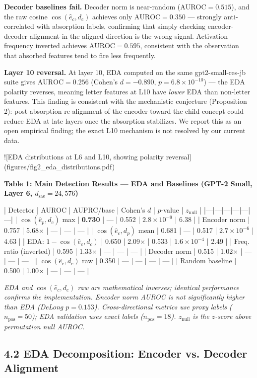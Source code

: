 \documentclass{article}
\begin{document}
\textbf{Decoder baselines fail.} Decoder norm is near-random ($\text{AUROC} = 0.515$), and
the raw cosine $\cos(\hat{e}_c, d_c)$ achieves only $\text{AUROC} = 0.350$ — strongly
anti-correlated with absorption labels, confirming that simply checking encoder-decoder
alignment in the aligned direction is the wrong signal.
Activation frequency inverted achieves $\text{AUROC} = 0.595$, consistent with the
observation that absorbed features tend to fire less frequently.

\textbf{Layer 10 reversal.} At layer 10, EDA computed on the same gpt2-small-res-jb suite gives
$\text{AUROC} = 0.256$ (Cohen's $d = -0.890$, $p = 6.8 \times 10^{-10}$) — the EDA polarity
reverses, meaning letter features at L10 have \textit{lower} EDA than non-letter features.
This finding is consistent with the mechanistic conjecture (Proposition 2): post-absorption
re-alignment of the encoder toward the child concept could reduce EDA at late layers once the
absorption stabilizes. We report this as an open empirical finding; the exact L10 mechanism
is not resolved by our current data.

![EDA distributions at L6 and L10, showing polarity reversal](figures/fig2_eda_distributions.pdf)


\textbf{Table 1: Main Detection Results — EDA and Baselines (GPT-2 Small, Layer 6, $d_\text{sae} = 24{,}576$)}

| Detector | AUROC | AUPRC/base | Cohen's $d$ | $p$-value | $z_\text{null}$ |
|---|---|---|---|---|---|
| $\cos(\hat{e}_p, d_c)$ max | \textbf{0.730} | — | 0.552 | $2.8 \times 10^{-9}$ | 6.38 |
| Encoder norm | 0.757 | 5.68$\times$ | — | — | — |
| $\cos(\hat{e}_c, d_p)$ mean | 0.681 | — | 0.517 | $2.7 \times 10^{-6}$ | 4.63 |
| EDA: $1 - \cos(\hat{e}_c, d_c)$ | 0.650 | 2.09$\times$ | 0.533 | $1.6 \times 10^{-4}$ | 2.49 |
| Freq. ratio (inverted) | 0.595 | 1.33$\times$ | — | — | — |
| Decoder norm | 0.515 | 1.02$\times$ | — | — | — |
| $\cos(\hat{e}_c, d_c)$ raw | 0.350 | — | — | — | — |
| Random baseline | 0.500 | 1.00$\times$ | — | — | — |

\textit{EDA and $\cos(\hat{e}_c, d_c)$ raw are mathematical inverses; identical performance confirms the implementation. Encoder norm AUROC is not significantly higher than EDA (DeLong $p = 0.153$). Cross-directional metrics use proxy labels ($n_\text{pos} = 50$); EDA validation uses exact labels ($n_\text{pos} = 18$). $z_\text{null}$ is the $z$-score above permutation null AUROC.}


\subsection{4.2 EDA Decomposition: Encoder vs. Decoder Alignment}
\end{document}

